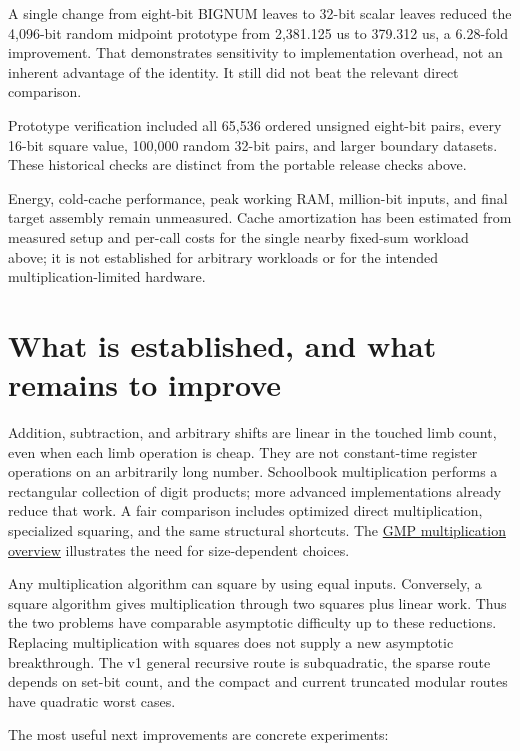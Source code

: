 \documentclass[11pt,a4paper]{article}
\begin{document}
A single change from eight-bit BIGNUM leaves to 32-bit scalar leaves reduced the 4,096-bit random midpoint prototype from 2,381.125 us to 379.312 us, a 6.28-fold improvement. That demonstrates sensitivity to implementation overhead, not an inherent advantage of the identity. It still did not beat the relevant direct comparison.

Prototype verification included all 65,536 ordered unsigned eight-bit pairs, every 16-bit square value, 100,000 random 32-bit pairs, and larger boundary datasets. These historical checks are distinct from the portable release checks above.

Energy, cold-cache performance, peak working RAM, million-bit inputs, and final target assembly remain unmeasured. Cache amortization has been estimated from measured setup and per-call costs for the single nearby fixed-sum workload above; it is not established for arbitrary workloads or for the intended multiplication-limited hardware.

\section{What is established, and what remains to improve}

Addition, subtraction, and arbitrary shifts are linear in the touched limb count, even when each limb operation is cheap. They are not constant-time register operations on an arbitrarily long number. Schoolbook multiplication performs a rectangular collection of digit products; more advanced implementations already reduce that work. A fair comparison includes optimized direct multiplication, specialized squaring, and the same structural shortcuts. The \href{\detokenize{https://gmplib.org/manual/Multiplication-Algorithms}}{GMP multiplication overview} illustrates the need for size-dependent choices.

Any multiplication algorithm can square by using equal inputs. Conversely, a square algorithm gives multiplication through two squares plus linear work. Thus the two problems have comparable asymptotic difficulty up to these reductions. Replacing multiplication with squares does not supply a new asymptotic breakthrough. The v1 general recursive route is subquadratic, the sparse route depends on set-bit count, and the compact and current truncated modular routes have quadratic worst cases.

The most useful next improvements are concrete experiments:
\end{document}
